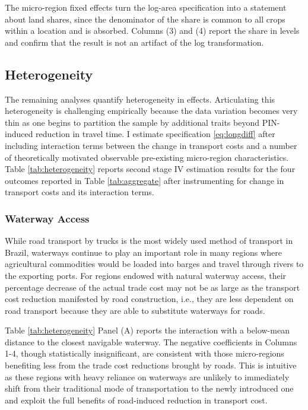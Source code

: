 \documentclass[11pt]{article}
\begin{document}
The micro-region fixed effects turn the log-area specification into a statement about land shares, since the denominator of the share is common to all crops within a location and is absorbed. Columns (3) and (4) report the share in levels and confirm that the result is not an artifact of the log transformation.

\subsection{Heterogeneity}
The remaining analyses quantify heterogeneity in effects. Articulating this heterogeneity is challenging empirically because the data variation becomes very thin as one begins to partition the sample by additional traits beyond PIN-induced reduction in travel time. I estimate specification \eqref{eq:longdiff} after including interaction terms between the change in transport costs and a number of theoretically motivated observable pre-existing micro-region characteristics. Table \ref{tab:heterogeneity} reports second stage IV estimation results for the four outcomes reported in Table \ref{tab:aggregate} after instrumenting for change in transport costs and its interaction terms.

\subsubsection{Waterway Access}

While road transport by trucks is the most widely used method of transport in Brazil, waterways continue to play an important role in many regions where agricultural commodities would be loaded into barges and travel through rivers to the exporting ports. For regions endowed with natural waterway access, their percentage decrease of the actual trade cost may not be as large as the transport cost reduction manifested by road construction, i.e., they are less dependent on road transport because they are able to substitute waterways for roads. 

Table \ref{tab:heterogeneity} Panel (A) reports the interaction with a below-mean distance to the closest navigable waterway. The negative coefficients in Columns 1-4, though statistically insignificant, are consistent with those micro-regions benefiting less from the trade cost reductions brought by roads. This is intuitive as these regions with heavy reliance on waterways are unlikely to immediately shift from their traditional mode of transportation to the newly introduced one and exploit the full benefits of road-induced reduction in transport cost.
\end{document}
